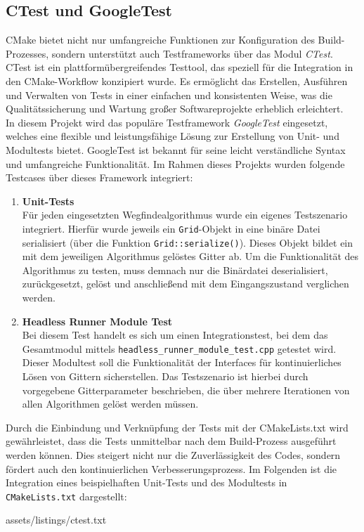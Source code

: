 \subsection{CTest und GoogleTest}
\label{subsec:ctest-integration}
CMake bietet nicht nur umfangreiche Funktionen zur Konfiguration des Build-Prozesses, sondern unterstützt auch Testframeworks über das Modul \textit{CTest}.
CTest ist ein plattformübergreifendes Testtool, das speziell für die Integration in den CMake-Workflow konzipiert wurde.
Es ermöglicht das Erstellen, Ausführen und Verwalten von Tests in einer einfachen und konsistenten Weise, was die Qualitätssicherung und Wartung großer Softwareprojekte erheblich erleichtert.\\
In diesem Projekt wird das populäre Testframework \textit{GoogleTest} eingesetzt, welches eine flexible und leistungsfähige Lösung zur Erstellung von Unit- und Modultests bietet.
GoogleTest ist bekannt für seine leicht verständliche Syntax und umfangreiche Funktionalität. \cite{Cmake2024, GTest2024}
Im Rahmen dieses Projekts wurden folgende Testcases über dieses Framework integriert:
\begin{enumerate}
    \item \textbf{Unit-Tests}\\
    Für jeden eingesetzten Wegfindealgorithmus wurde ein eigenes Testszenario integriert.
    Hierfür wurde jeweils ein \texttt{Grid}-Objekt in eine binäre Datei serialisiert (über die Funktion \texttt{Grid::serialize()}).
    Dieses Objekt bildet ein mit dem jeweiligen Algorithmus gelöstes Gitter ab.
    Um die Funktionalität des Algorithmus zu testen, muss demnach nur die Binärdatei deserialisiert, zurückgesetzt, gelöst und anschließend mit dem Eingangszustand verglichen werden.
    \item \textbf{Headless Runner Module Test}\\
    Bei diesem Test handelt es sich um einen Integrationstest, bei dem das Gesamtmodul mittels \texttt{headless\_runner\_module\_test.cpp} getestet wird.
    Dieser Modultest soll die Funktionalität der Interfaces für kontinuierliches Lösen von Gittern sicherstellen.
    Das Testszenario ist hierbei durch vorgegebene Gitterparameter beschrieben, die über mehrere Iterationen von allen Algorithmen gelöst werden müssen.
\end{enumerate}
Durch die Einbindung und Verknüpfung der Tests mit der CMakeLists.txt wird gewährleistet, dass die Tests unmittelbar nach dem Build-Prozess ausgeführt werden können.
Dies steigert nicht nur die Zuverlässigkeit des Codes, sondern fördert auch den kontinuierlichen Verbesserungsprozess.
Im Folgenden ist die Integration eines beispielhaften Unit-Tests und des Modultests in \texttt{CMakeLists.txt} dargestellt:

{assets/listings/ctest.txt}


